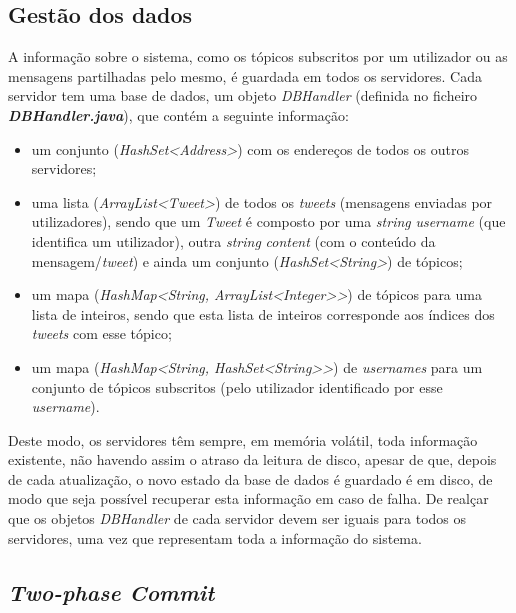 \documentclass[a4paper]{report}
\begin{document}
		\subsection{Gestão dos dados}

		A informação sobre o sistema, como os tópicos subscritos por um utilizador ou as mensagens partilhadas pelo mesmo, é guardada em todos os servidores.
		Cada servidor tem uma base de dados, um objeto \textit{DBHandler} (definida no ficheiro \textit{\textbf{DBHandler.java}}), que contém a seguinte informação:
		\begin{itemize}
			\item um conjunto (\textit{HashSet<Address>}) com os endereços de todos os outros servidores;
			\item uma lista (\textit{ArrayList<Tweet>}) de todos os \textit{tweets} (mensagens enviadas por utilizadores), 
			sendo que um \textit{Tweet} é composto por uma \textit{string} \textit{username} (que identifica um utilizador), outra \textit{string} \textit{content} (com o conteúdo da mensagem/\textit{tweet})
			e ainda um conjunto (\textit{HashSet<String>}) de tópicos;
			\item um mapa (\textit{HashMap<String, ArrayList<Integer>>}) de tópicos para uma lista de inteiros, sendo que esta lista de inteiros corresponde aos índices dos \textit{tweets} com esse tópico;
			\item um mapa (\textit{HashMap<String, HashSet<String>>}) de \textit{usernames} para um conjunto de tópicos subscritos (pelo utilizador identificado por esse \textit{username}).
		\end{itemize}

		Deste modo, os servidores têm sempre, em memória volátil, toda informação existente, não havendo assim o atraso da leitura de disco, apesar de que, depois de cada atualização, o novo estado da base de dados é guardado é em disco, de modo que seja possível recuperar esta informação em caso de falha.
		De realçar que os objetos \textit{DBHandler} de cada servidor devem ser iguais para todos os servidores, uma vez que representam toda a informação do sistema.


		\subsection{\textit{Two-phase Commit}}
\end{document}
